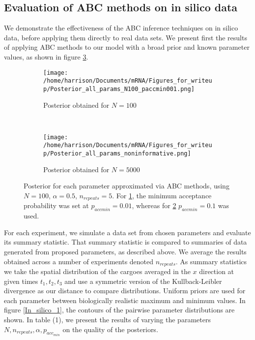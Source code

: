 \documentclass[twocolumn]{biophys}
\begin{document}
\subsection{Evaluation of ABC methods on in silico data}
We demonstrate the effectiveness of the ABC inference techniques on in silico data, before applying them directly to real data sets. 
We present first the results of applying ABC methods to our model with a broad prior and known parameter values, as shown in figure \ref{FIG:ABC_Posterior}.
\begin{figure} 
        \centering
        \begin{subfigure}[h]{0.95\columnwidth}
                \texttt{[image: /home/harrison/Documents/mRNA/Figures\_for\_writeup/Posterior\_all\_params\_N100\_paccmin001.png]}
                \caption{Posterior obtained for $N=100$}
                \label{fig:a}
        \end{subfigure}%
        
        
        ~ %
        \begin{subfigure}[h]{0.95\columnwidth}
                \texttt{[image: /home/harrison/Documents/mRNA/Figures\_for\_writeup/Posterior\_all\_params\_noninformative.png]}
                \caption{Posterior obtained for $N=5000$}
                \label{fig:b}
        \end{subfigure}
        \caption{Posterior for each parameter approximated via ABC methods, using $N=100$, $\alpha=0.5$, $n_{repeats}=5$. For \ref{fig:a}, the minimum acceptance probability was set at $p_{accmin} = 0.01$, whereas for \ref{fig:b} $p_{accmin} = 0.1$ was used.}
        \label{FIG:ABC_Posterior}
\end{figure}

For each experiment, we simulate a data set from chosen parameters and evaluate its summary statistic. 
That summary statistic is compared to summaries of data generated from proposed parameters, as described above.
We average the results obtained across a number of experiments denoted $n_{repeats}$.
As summary statistics we take the spatial distribution of the cargoes averaged in the $x$ direction at given times $t_1,t_2,t_3$ and use a symmetric version of the Kullback-Leibler divergence as our distance to compare distributions.
Uniform priors are used for each parameter between biologically realistic maximum and minimum values.
In figure \ref{In_silico_1}, the contours of the pairwise parameter distributions are shown. 
In table (1), we present the results of varying the parameters $N, n_{repeats}, \alpha, p_{acc_{min}}$ on the quality of the posteriors.
\end{document}
